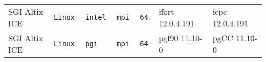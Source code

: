 \begin{tabular}{lllllll}
SGI Altix ICE         &\tt Linux  &\tt intel        &\tt mpi        &\tt 64              & ifort \footnotesize 12.0.4.191     & icpc \footnotesize 12.0.4.191   \\ %
SGI Altix ICE         &\tt Linux  &\tt pgi          &\tt mpi        &\tt 64              & pgf90 \footnotesize 11.10-0        & pgCC \footnotesize 11.10-0      \\ %

\end{tabular}
